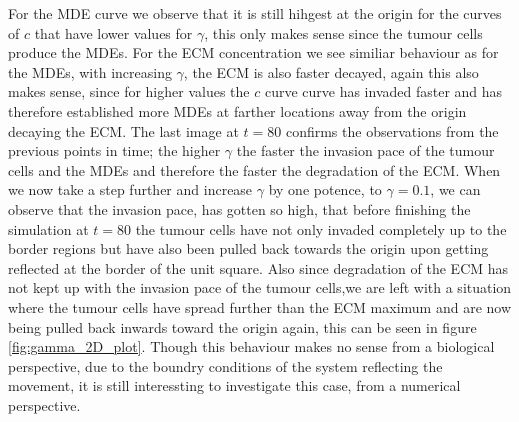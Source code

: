 For the MDE curve we observe that it is still hihgest at the origin for the curves of $c$ that have lower values for $\gamma$, this only makes sense since the tumour cells produce the MDEs. For the ECM concentration we see similiar behaviour as for the MDEs, with increasing $\gamma$, the ECM is also faster decayed, again this also makes sense, since for higher values the $c$ curve curve has invaded faster and has therefore established more MDEs at farther locations away from the origin decaying the ECM.
The last image at $t=80$ confirms the observations from the previous points in time; the higher $\gamma$ the faster the invasion pace of the tumour cells and the MDEs and therefore the faster the degradation of the ECM. 
When we now take a step further and increase $\gamma$ by one potence, to $\gamma=0.1$, we can observe that the invasion pace, has gotten so high, that before finishing the simulation at $t=80$ the tumour cells have not only invaded completely up to the border regions but have also been pulled back towards the origin upon getting reflected at the border of the unit square. Also since degradation of the ECM has not kept up with the invasion pace of the tumour cells,we are left with a situation where the tumour cells have spread further than the ECM maximum and are now being pulled back inwards toward the origin again, this can be seen in figure \ref{fig:gamma_2D_plot}. Though this behaviour makes no sense from a biological perspective, due to the boundry conditions of the system reflecting the movement, it is still interessting to investigate this case, from a numerical perspective.\newline 
